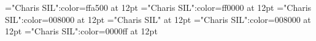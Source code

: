 \documentclass[a4paper]{article}
\begin{document}
\pagestyle{plain}
\sloppy
\setlength{\parfillskip}{0pt plus 1fil}
\font\xitemen="Charis SIL":color=ffa500 at 12pt
\font\xitemmain="Charis SIL":color=ff0000 at 12pt
\font\xitemenxitem="Charis SIL":color=008000 at 12pt
\font\main="Charis SIL" at 12pt
\font\xitemenmain="Charis SIL":color=008000 at 12pt
\font\xitemxitemmain="Charis SIL":color=0000ff at 12pt

\pagestyle{fancy} 








\end{document}

